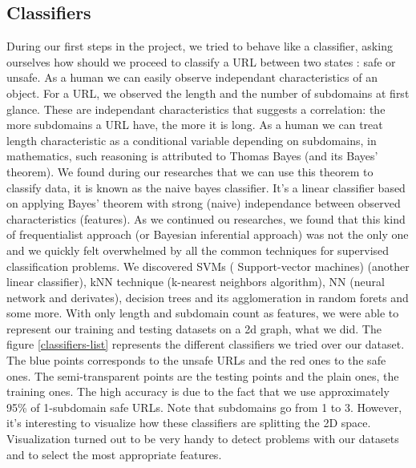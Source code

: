 \documentclass[conference,11pt]{IEEEtran}
\begin{document}
\subsection{Classifiers}
During our first steps in the project, we tried to behave like a classifier,
asking ourselves how should we proceed to classify a URL between two states :
safe or unsafe. As a human we can easily observe independant characteristics of
an object. For a URL, we observed the length and the number of subdomains at
first glance. These are independant characteristics that suggests a correlation:
the more subdomains a URL have, the more it is long. As a human we can treat
length characteristic as a conditional variable depending on subdomains, in
mathematics, such reasoning is attributed to Thomas Bayes (and its Bayes'
theorem). We found during our researches that we can use this theorem to
classify data, it is known as the naive bayes classifier. It's a linear
classifier based on applying Bayes' theorem with strong (naive) independance
between observed characteristics (features). As we continued ou researches, we
found that this kind of frequentialist approach (or Bayesian inferential
approach) was not the only one and we quickly felt overwhelmed by all the common
techniques for supervised classification problems. We discovered SVMs (%
Support-vector machines) (another linear classifier), kNN technique (k-nearest
neighbors algorithm), NN (neural network and derivates), decision trees and
its agglomeration in random forets and some more. With only length and subdomain
count as features, we were able to represent our training and testing datasets
on a 2d graph, what we did. The figure \ref{classifiers-list} represents the
different classifiers we tried over our dataset. The blue points corresponds to
the unsafe URLs and the red ones to the safe ones. The semi-transparent points
are the testing points and the plain ones, the training ones. The high accuracy
is due to the fact that we use approximately 95\% of 1-subdomain safe URLs.
Note that subdomains go from 1 to 3. However, it's interesting to visualize how
these classifiers are splitting the 2D space. Visualization turned out to be
very handy to detect problems with our datasets and to select the most appropriate
features.
\end{document}
